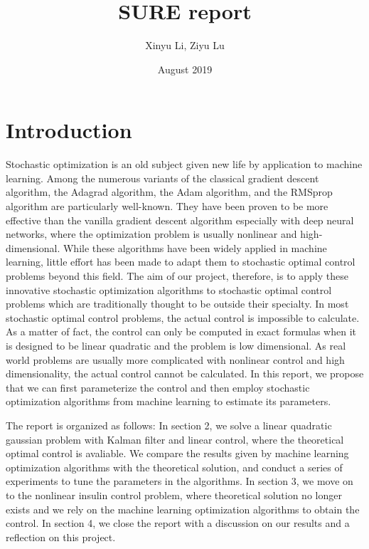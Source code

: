 \documentclass{article}
\title{SURE report}
\author{Xinyu Li, Ziyu Lu}
\date{August 2019}
\begin{document}
\maketitle

\section{Introduction} 
Stochastic optimization is an old subject given new life by application to machine learning. Among the numerous variants of the classical gradient descent algorithm, the Adagrad algorithm\cite{duchi2011adaptive}, the Adam algorithm\cite{kingma2014adam}, and the RMSprop algorithm\cite{tieleman2012lecture} are particularly well-known. They have been proven to be more effective than the vanilla gradient descent algorithm especially with deep neural networks, where the optimization problem is usually nonlinear and high-dimensional. While these algorithms have been widely applied in machine learning, little effort has been made to adapt them to stochastic optimal control problems beyond this field. The aim of our project, therefore, is to apply these innovative stochastic optimization algorithms to stochastic optimal control problems which are traditionally thought to be outside their specialty. In most stochastic optimal control problems, the actual control is impossible to calculate. As a matter of fact, the control can only be computed in exact formulas when it is designed to be linear quadratic and the problem is low dimensional. As real world problems are usually more complicated with nonlinear control and high dimensionality, the actual control cannot be calculated. In this report, we propose that we can first parameterize the control and then employ stochastic optimization algorithms from machine learning to estimate its parameters.

\bigskip
\noindent The report is organized as follows: In section 2, we solve a linear quadratic gaussian problem with Kalman filter and linear control, where the theoretical optimal control is avaliable. We compare the results given by machine learning optimization algorithms with the theoretical solution, and conduct a series of experiments to tune the parameters in the algorithms. In section 3, we move on to the nonlinear insulin control problem, where theoretical solution no longer exists and we rely on the machine learning optimization algorithms to obtain the control. In section 4, we close the report with a discussion on our results and a reflection on this project.
\end{document}
